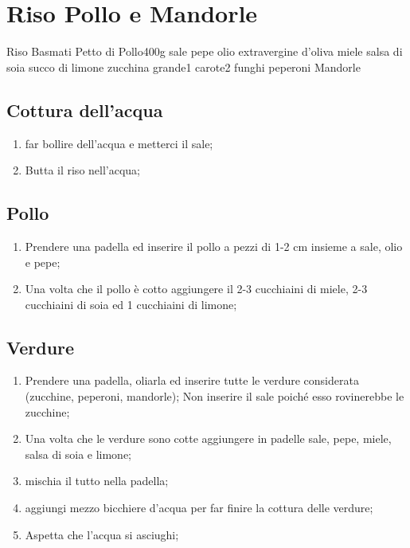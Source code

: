 \section{Riso Pollo e Mandorle}

\generalRecipeInfos{}

\ingredienti%
    {Riso Basmati}{}%
    {Petto di Pollo}{400g}%
    {sale}{\qb{}}%
    {pepe}{\qb{}}%
    {olio extravergine d'oliva}{\qb{}}%
    {miele}{\qb{}}%
    {salsa di soia}{\qb{}}%
    {succo di limone}{\qb{}}%
    {zucchina grande}{1}%
    {carote}{2}%
    {funghi}{\qb{}}%
    {peperoni}{\qb{}}%
    {Mandorle}{\qb{}}%


\subsection{Cottura dell'acqua}

\begin{enumerate}
    \item far bollire dell'acqua e metterci il sale;
    \item Butta il riso nell'acqua;
\end{enumerate}

\subsection{Pollo}

\begin{enumerate}
    \item Prendere una padella ed inserire il pollo a pezzi di 1-2 cm insieme a sale, olio e pepe;
    \item Una volta che il pollo è cotto aggiungere il 2-3 cucchiaini di miele, 2-3 cucchiaini di soia ed 1 cucchiaini di limone;
\end{enumerate}

\subsection{Verdure}

\begin{enumerate}
    \item Prendere una padella, oliarla ed inserire tutte le verdure considerata (zucchine, peperoni, mandorle); Non inserire il sale poiché esso rovinerebbe le zucchine;
    \item Una volta che le verdure sono cotte aggiungere in padelle sale, pepe, miele, salsa di soia e limone;
    \item mischia il tutto nella padella;
    \item aggiungi mezzo bicchiere d'acqua per far finire la cottura delle verdure;
    \item Aspetta che l'acqua si asciughi;
\end{enumerate}

